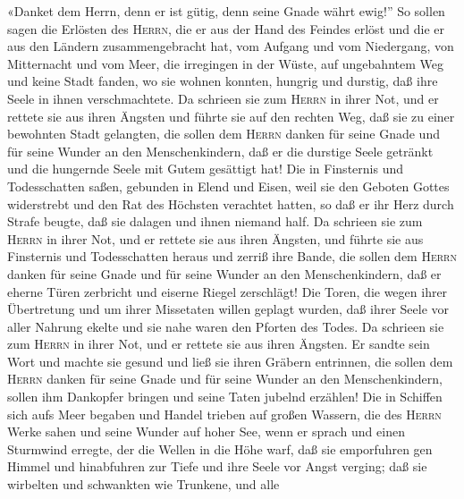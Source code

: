  «Danket dem Herrn, denn er ist gütig, denn seine Gnade
währt ewig!''  So sollen sagen die Erlösten des
\textsc{Herrn}, die er aus der Hand des Feindes erlöst 
und die er aus den Ländern zusammengebracht hat, vom Aufgang und vom
Niedergang, von Mitternacht und vom Meer,  die irregingen
in der Wüste, auf ungebahntem Weg und keine Stadt fanden, wo sie wohnen
konnten,  hungrig und durstig, daß ihre Seele in ihnen
verschmachtete.  Da schrieen sie zum \textsc{Herrn} in
ihrer Not, und er rettete sie aus ihren Ängsten  und
führte sie auf den rechten Weg, daß sie zu einer bewohnten Stadt
gelangten,  die sollen dem \textsc{Herrn} danken für seine
Gnade und für seine Wunder an den Menschenkindern,  daß er
die durstige Seele getränkt und die hungernde Seele mit Gutem gesättigt
hat!  Die in Finsternis und Todesschatten saßen, gebunden
in Elend und Eisen,  weil sie den Geboten Gottes
widerstrebt und den Rat des Höchsten verachtet hatten, 
so daß er ihr Herz durch Strafe beugte, daß sie dalagen und ihnen
niemand half.  Da schrieen sie zum \textsc{Herrn} in
ihrer Not, und er rettete sie aus ihren Ängsten,  und
führte sie aus Finsternis und Todesschatten heraus und zerriß ihre
Bande,  die sollen dem \textsc{Herrn} danken für seine
Gnade und für seine Wunder an den Menschenkindern,  daß
er eherne Türen zerbricht und eiserne Riegel zerschlägt! 
Die Toren, die wegen ihrer Übertretung und um ihrer Missetaten willen
geplagt wurden,  daß ihrer Seele vor aller Nahrung ekelte
und sie nahe waren den Pforten des Todes.  Da schrieen
sie zum \textsc{Herrn} in ihrer Not, und er rettete sie aus ihren
Ängsten.  Er sandte sein Wort und machte sie gesund und
ließ sie ihren Gräbern entrinnen,  die sollen dem
\textsc{Herrn} danken für seine Gnade und für seine Wunder an den
Menschenkindern,  sollen ihm Dankopfer bringen und seine
Taten jubelnd erzählen!  Die in Schiffen sich aufs Meer
begaben und Handel trieben auf großen Wassern,  die des
\textsc{Herrn} Werke sahen und seine Wunder auf hoher See,
 wenn er sprach und einen Sturmwind erregte, der die
Wellen in die Höhe warf,  daß sie emporfuhren gen Himmel
und hinabfuhren zur Tiefe und ihre Seele vor Angst verging;
 daß sie wirbelten und schwankten wie Trunkene, und alle
